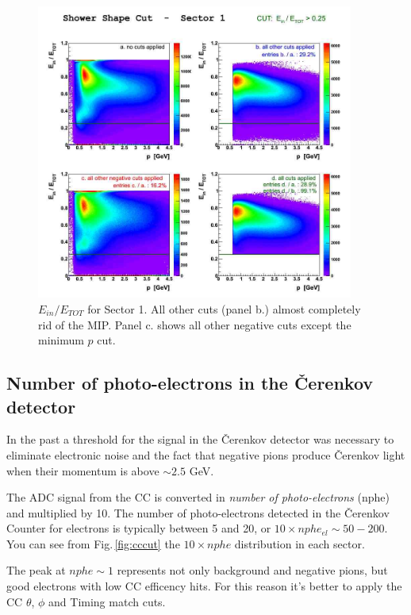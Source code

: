 \begin{figure}[h]
  \centering
		\includegraphics[width=0.93\textwidth]{img/einetot_sect1.jpg}
		\caption{$E_{in}/E_{TOT}$ for Sector 1. All other cuts (panel b.)
					almost completely rid of the MIP. Panel c. shows all other negative
               cuts except the minimum $p$ cut.}
 		\label{fig:einetot}
\end{figure}


\clearpage\newpage
\subsection{Number of photo-electrons in the \v Cerenkov detector}
\label{sec:cc_cut}
In the past a threshold for the signal in the \v Cerenkov detector was necessary to eliminate
electronic noise and the fact that negative pions produce \v Cerenkov light when 
their momentum is above $\sim 2.5$ GeV.

The ADC signal from the CC is converted in 
{\it number of photo-electrons} (nphe) and
multiplied by 10. The number of photo-electrons detected in the \v Cerenkov
Counter for electrons is typically between 5 and 20, or $10\times nphe_{el} \sim 50-200$.
You can see from Fig.\,\ref{fig:cccut} the $10\times nphe$
distribution in each sector.

The peak at $nphe \sim 1$ represents not only background and
negative pions, but good electrons with low CC efficency hits. For this reason
it's better to apply the CC $\theta$, $\phi$ and Timing match cuts.

